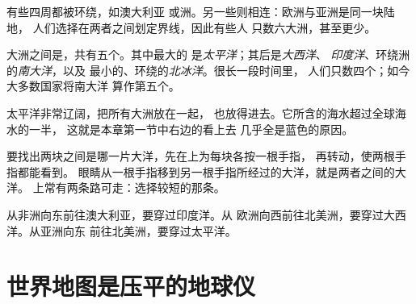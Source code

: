 \begin{remark}[一块大陆在哪里结束？]\label{rem:g3:continents-and-oceans:where}
有些四周都被环绕，如澳大利亚
或洲。另一些则相连：欧洲与亚洲是同一块陆地，
人们选择在两者之间划定界线，因此有些人
只数六大洲，甚至更少。
\end{remark}

大洲之间是，共有五个。其中最大的
是\emph{太平洋}；其后是\emph{大西洋}、
\emph{印度洋}、环绕洲的\emph{南大洋}，以及
最小的、环绕的\emph{北冰洋}。很长一段时间里，
人们只数四个；如今大多数国家将南大洋
算作第五个。

\begin{example}[太平洋有多大？]\label{ex:g3:continents-and-oceans:pacific}
太平洋非常辽阔，把所有大洲放在一起，
也放得进去。它所含的海水超过全球海水的一半，
这就是本章第一节中右边的看上去
几乎全是蓝色的原因。
\end{example}

\begin{method}[找出两块大陆之间的大洋]\label{met:g3:continents-and-oceans:between}
要找出两块之间是哪一片大洋，先在上为每块各按一根手指，
再转动，使两根手指都能看到。
眼睛从一根手指移到另一根手指所经过的大洋，就是两者之间的大洋。
上常有两条路可走：选择较短的那条。
\end{method}

\begin{example}[非洲与澳大利亚]\label{ex:g3:continents-and-oceans:africa-australia}
从非洲向东前往澳大利亚，要穿过印度洋。从
欧洲向西前往北美洲，要穿过大西洋。从亚洲向东
前往北美洲，要穿过太平洋。
\end{example}

\section{世界地图是压平的地球仪}


